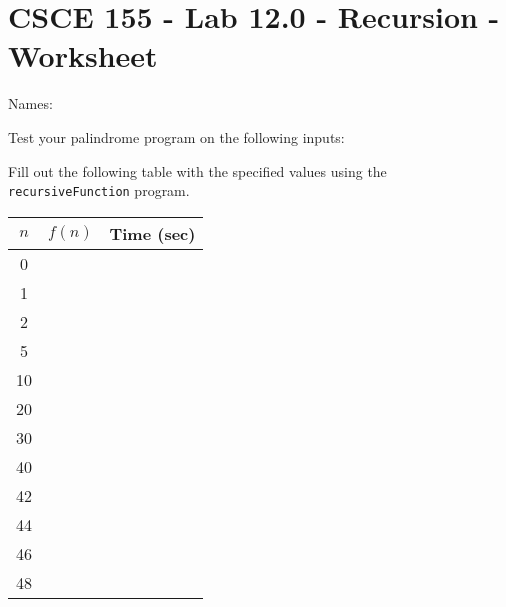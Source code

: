 \documentclass[10pt]{exam}
\begin{document}
\section*{CSCE 155 - Lab 12.0 - Recursion - Worksheet}

Names: \underline{\hspace{10cm}}

\begin{questions}

\question Test your palindrome program on the following inputs:

\question Fill out the following table with the specified values using the \texttt{recursiveFunction} program.

\begin{table}[h]
\centering
{\renewcommand{\arraystretch}{1.35}
\begin{tabular}{|c|p{4cm}|p{4cm}|}
\hline
$n$ & $f(n)$ & Time (sec) \\
\hline\hline
0   &        &            \\
\hline
1   &        &            \\
\hline
2   &        &            \\
\hline
5   &        &            \\
\hline
10  &        &            \\
\hline
20  &        &            \\
\hline
30  &        &            \\
\hline
40  &        &            \\
\hline
42  &        &            \\
\hline
44  &        &            \\
\hline
46  &        &            \\
\hline
48  &        &           \\
\hline
\end{tabular}
}
\end{table}


\end{questions}
\end{document}
